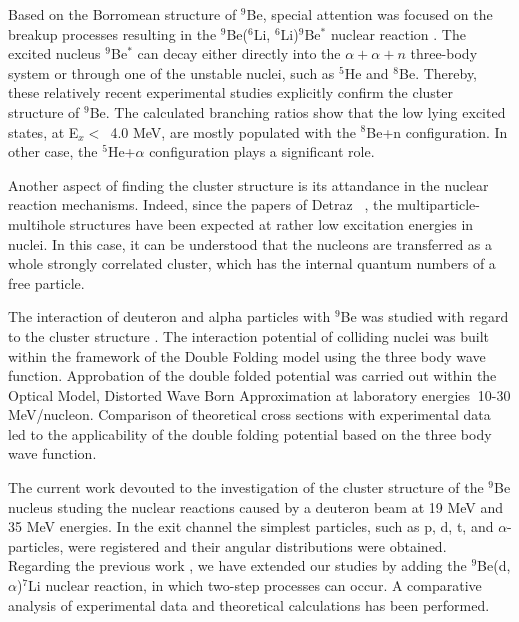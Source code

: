 \documentclass[10pt]{iopart}
\begin{document}
Based on the Borromean structure of $^9$Be, special attention was focused on the breakup processes resulting in the $^9$Be($^6$Li, $^6$Li)$^9$Be$^*$ nuclear reaction \cite{brown2007, papka2007}. The excited nucleus $^9$Be$^*$ can decay either directly into the $\alpha+\alpha+n$ three-body system or through one of the unstable nuclei, such as $^5$He and $^8$Be. Thereby, these relatively recent experimental studies explicitly confirm the cluster structure of $^9$Be. 
The calculated branching ratios  show that the low lying excited states, at E$_x <$~4.0 MeV,  are mostly populated with the $^8$Be+n configuration. In other case, the $^5$He+$\alpha$ configuration plays a significant  role.

Another aspect of finding the cluster structure is its attandance in the nuclear reaction mechanisms. Indeed, since the papers of Detraz \etal~\cite{detraz1970, detraz1974}, the multiparticle-multihole structures have been expected at rather low excitation energies in nuclei. In this case, it can be understood that the nucleons are transferred as a whole strongly correlated cluster, which has the internal quantum numbers of a free particle.

The interaction of deuteron and alpha particles with $^9$Be was studied with regard to the cluster structure \cite{urazbekov2016, urazbekov2017}. The interaction potential of colliding nuclei was built within the framework of the Double Folding model using the three body wave function. Approbation of the double folded potential was carried out within the Optical Model, Distorted Wave Born Approximation at laboratory energies $~$10-30 MeV/nucleon. Comparison of theoretical cross sections with experimental data led to the applicability of the double folding potential based on the three body wave function.

The current work devouted to the investigation of the cluster structure of the $^9$Be nucleus studing the nuclear reactions caused by a deuteron beam at 19 MeV and 35 MeV energies. In the exit channel the simplest particles, such as p, d, t, and $\alpha$-particles, were registered and their angular distributions were obtained. Regarding  the previous work \cite{urazbekov2017}, we have extended our studies by adding the $^9$Be(d,$\alpha$)$^7$Li nuclear reaction, in which  two-step processes can  occur. A comparative analysis of experimental data and theoretical calculations has been performed.
	
\end{document}
